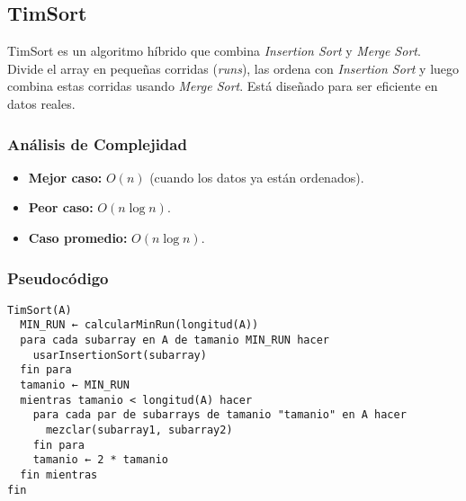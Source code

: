 \documentclass[11pt,openany]{book}
\begin{document}
\subsection{TimSort}
TimSort es un algoritmo híbrido que combina \textit{Insertion Sort} y \textit{Merge Sort}. Divide el array en pequeñas corridas (\textit{runs}), las ordena con \textit{Insertion Sort} y luego combina estas corridas usando \textit{Merge Sort}. Está diseñado para ser eficiente en datos reales.

\subsubsection{Análisis de Complejidad}
\begin{itemize}
    \item \textbf{Mejor caso:} $O(n)$ (cuando los datos ya están ordenados).
    \item \textbf{Peor caso:} $O(n \log n)$.
    \item \textbf{Caso promedio:} $O(n \log n)$.
\end{itemize}

\subsubsection{Pseudocódigo}
\begin{verbatim}
TimSort(A)
  MIN_RUN ← calcularMinRun(longitud(A))
  para cada subarray en A de tamanio MIN_RUN hacer
    usarInsertionSort(subarray)
  fin para
  tamanio ← MIN_RUN
  mientras tamanio < longitud(A) hacer
    para cada par de subarrays de tamanio "tamanio" en A hacer
      mezclar(subarray1, subarray2)
    fin para
    tamanio ← 2 * tamanio
  fin mientras
fin
\end{verbatim}
\end{document}
